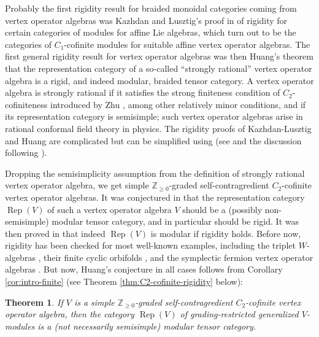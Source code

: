 \documentclass[11pt, reqno]{amsart}
\newtheorem{thm}{Theorem}[section]
\theoremstyle{definition}\newtheorem{defi}[thm]{Definition}
\theoremstyle{definition}\newtheorem{rem}[thm]{Remark}
\theoremstyle{definition}\newtheorem{exam}[thm]{Example}
\theoremstyle{definition}\newtheorem{assum}[thm]{Assumption}
\newcommand{\ZZ}{\mathbb{Z}}
\DeclareMathOperator{\rep}{Rep}
\begin{document}
Probably the first rigidity result for braided monoidal categories coming from vertex operator algebras was Kazhdan and Lusztig's proof in \cite{KL4} of rigidity for certain categories of modules for affine Lie algebras, which turn out to be the categories of $C_1$-cofinite modules for suitable affine vertex operator algebras.
The first general rigidity result for vertex operator algebras was then Huang's theorem \cite{Hu-Verlinde, Hu-rig-mod} that the representation category of a so-called ``strongly rational'' vertex operator algebra is a rigid, and indeed modular, braided tensor category. A vertex operator algebra is strongly rational if it satisfies the strong finiteness condition of $C_2$-cofiniteness introduced by Zhu \cite{Zh}, among other relatively minor conditions, and if its representation category is semisimple; such vertex operator algebras arise in rational conformal field theory in physics. The rigidity proofs of Kazhdan-Lusztig and Huang are complicated but can be simplified using \cite{EP} (see \cite[Section 4.3]{EP} and the discussion following \cite[Corollary 1.3]{EP}).

Dropping the semisimplicity assumption from the definition of strongly rational vertex operator algebra, we get simple $\ZZ_{\geq 0}$-graded self-contragredient $C_2$-cofinite vertex operator algebras. It was conjectured in \cite{Hu-conj} that the representation category $\rep(V)$ of such a vertex operator algebra $V$ should be a (possibly non-semisimple) modular tensor category, and in particular should be rigid. It was then proved in \cite{McR} that indeed $\rep(V)$ is modular if rigidity holds. Before now, rigidity has been checked for most well-known examples, including the triplet $W$-algebras \cite{TW}, their finite cyclic orbifolds \cite{CMY4}, and the symplectic fermion vertex operator algebras \cite{McR-Deligne}. But now, Huang's conjecture in all cases follows from Corollary \ref{cor:intro-finite} (see Theorem \ref{thm:C2-cofinite-rigidity} below):
\begin{thm}
If $V$ is a simple $\ZZ_{\geq 0}$-graded self-contragredient $C_2$-cofinite vertex operator algebra, then the category $\rep(V)$ of grading-restricted generalized $V$-modules is a (not necessarily semisimple) modular tensor category.
\end{thm}
\end{document}
